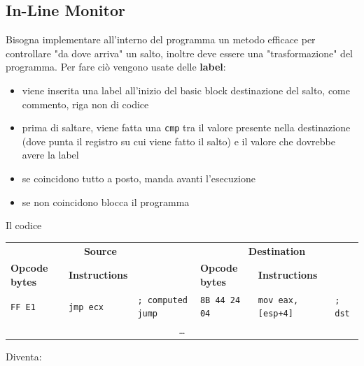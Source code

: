 \subsection{In-Line Monitor}

Bisogna implementare all'interno del programma un metodo efficace per controllare "da dove arriva" un salto, inoltre deve essere una "trasformazione" del programma. Per fare ciò vengono usate delle \textbf{label}:
\begin{itemize}
	\item viene inserita una label all'inizio del basic block destinazione del salto, come commento, riga non di codice
	\item prima di saltare, viene fatta una \texttt{cmp} tra il valore presente nella destinazione (dove punta il registro su cui viene fatto il salto) e il valore che dovrebbe avere la label
	\item se coincidono tutto a posto, manda avanti l'esecuzione
	\item se non coincidono blocca il programma
\end{itemize} 

Il codice
\begin{table}[h]
	\centering
	\begin{adjustbox}{max width=\textwidth}
	\begin{tabular}{@{} lll | lll @{}}
		\multicolumn{3}{c}{\bfseries Source} & \multicolumn{3}{c}{\bfseries Destination} \\
		\cmidrule(lr){1-3} \cmidrule(l){4-6}
		\bfseries Opcode bytes & \bfseries Instructions &
		& \bfseries Opcode bytes & \bfseries Instructions & \\
		\midrule
		\texttt{FF E1} & \texttt{jmp ecx} & \texttt{; computed jump}
		& \texttt{8B 44 24 04} & \texttt{mov eax, [esp+4]} & \texttt{; dst} \\
		\multicolumn{6}{c}{\dots} \\
	\end{tabular}
	\end{adjustbox}
\end{table}

Diventa:

